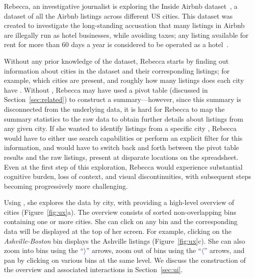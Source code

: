  Rebecca, an investigative journalist
is exploring the Inside Airbnb dataset~\cite{web:airbnb},
a dataset of all the Airbnb listings across different US cities.
This dataset was created to investigate the long-standing
accusation that many listings in Airbnb are illegally
run as hotel businesses, while avoiding taxes;
any listing available for rent for more than $60$ days
a year is considered to be operated as a hotel~\cite{accusation}. 

Without any prior knowledge of the dataset,
Rebecca starts by finding out information
about cities in the dataset and their corresponding listings;
for example, which cities are present,
and roughly how many listings does each city have .
Without \noah, Rebecca may have used
a pivot table (discussed in Section~\ref{sec:related})
to construct
a summary---however, since this summary is disconnected
from the underlying data, it is hard for Rebecca to
map the summary statistics to
the raw data to obtain further details
about listings from any given city.
If she wanted to identify listings from a specific city ,
Rebecca would have to either use search capabilities or
perform an explicit filter for this information,
and would have to switch back and forth between the
pivot table results and the raw listings,
present at disparate locations
on the spreadsheet.
Even at the first step of this exploration,
Rebecca would experience substantial cognitive burden,
loss of context,
and visual discontinuities,
with subsequent steps becoming progressively
more challenging.


Using \noah, she explores
the data by city,
with \noah providing a high-level overview of
cities (Figure~\ref{fig:ux}a).
The overview consists of sorted non-overlapping bins
containing one or more cities.
She can click on any bin and the corresponding
data will be displayed at the top of her screen.
For example, clicking on the {\em Ashville-Boston} bin
displays the Ashville listings (Figure~\ref{fig:ux}c).
She can also zoom into bins using the ``\textcolor{blue}{$\rangle$}'' arrows,
zoom out of bins using the ``\textcolor{blue}{$\langle$}'' arrows,
and pan by clicking on various bins at the same level.
We discuss the construction of the overview
and associated interactions in Section~\ref{sec:ui}.


